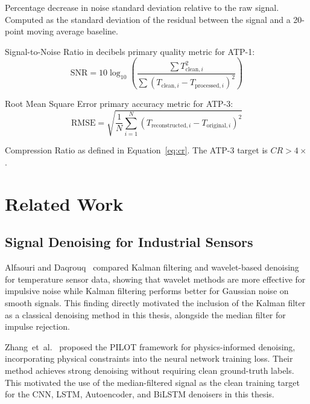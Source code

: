 \begin{description}[leftmargin=2em, itemsep=2pt]
\item[Noise Reduction (\%)] Percentage decrease in noise standard deviation relative to the raw signal. Computed as the standard deviation of the residual between the signal and a 20-point moving average baseline.

\item[SNR] Signal-to-Noise Ratio in decibels primary quality metric for ATP-1:
\begin{equation}
\text{SNR} = 10\log_{10}\!\left(\frac{\sum T_{\text{clean},i}^2}{\sum (T_{\text{clean},i} - T_{\text{processed},i})^2}\right)
\end{equation}

\item[RMSE] Root Mean Square Error primary accuracy metric for ATP-3:
\begin{equation}
\text{RMSE} = \sqrt{\frac{1}{N}\sum_{i=1}^{N}(T_{\text{reconstructed},i} - T_{\text{original},i})^2}
\end{equation}

\item[CR] Compression Ratio as defined in Equation~\eqref{eq:cr}. The ATP-3 target is $CR > 4\times$.
\end{description}

\section{Related Work}
\label{sec:related_work}

\subsection{Signal Denoising for Industrial Sensors}

Alfaouri and Daqrouq~\cite{kalman_wavelet_denoising} compared Kalman filtering and wavelet-based denoising for temperature sensor data, showing that wavelet methods are more effective for impulsive noise while Kalman filtering performs better for Gaussian noise on smooth signals. This finding directly motivated the inclusion of the Kalman filter as a classical denoising method in this thesis, alongside the median filter for impulse rejection.

Zhang~et~al.~\cite{zhang2023physics} proposed the PILOT framework for physics-informed denoising, incorporating physical constraints into the neural network training loss. Their method achieves strong denoising without requiring clean ground-truth labels. This motivated the use of the median-filtered signal as the clean training target for the CNN, LSTM, Autoencoder, and BiLSTM denoisers in this thesis.

